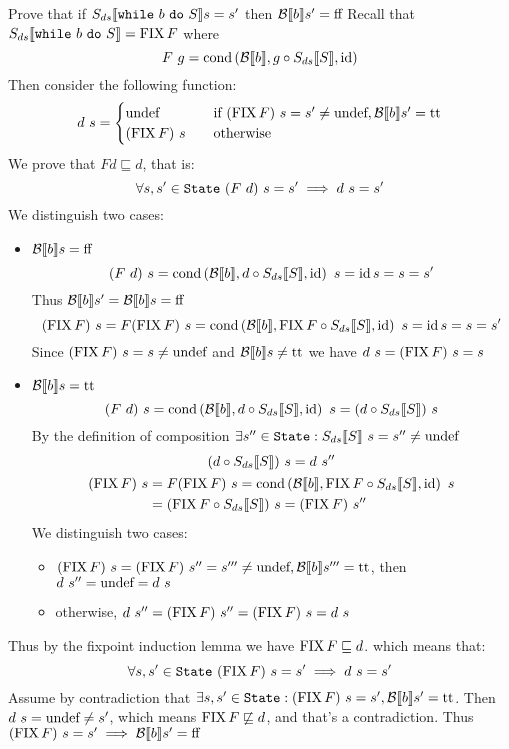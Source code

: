 \begin{exercise}{
    Prove that if $\Sds{\wwhile{b}{S}} s = s'$ then $\Bool{b} s' = \False$
}
    Recall that $\Sds{\wwhile{b}{S}} = \FIX F$ where
    \[ F\ g= \cond{\Bool{b}}{g \circ \Sds{S}}{\id} \]
    Then consider the following function:
    \[
        d\ s = \begin{cases}
            \undef &\quad \text{if } (\FIX F)\ s = s' \neq \undef, \Bool{b} s' = \True \\
            (\FIX F)\ s &\quad \text{otherwise}
        \end{cases}
    \]
    We prove that $F d \sqsubseteq d$, that is:
    \[ \forall s, s' \in \State\ (F\ d)\ s = s' \implies d\ s = s' \]
    We distinguish two cases:
    \begin{itemize}
        \item $\Bool{b} s = \False$
            \[ (F\ d)\ s = \cond{\Bool{b}}{d \circ \Sds{S}}{\id}\ s = \id s = s = s' \]
            Thus $\Bool{b} s' = \Bool{b} s = \False$
            \[ (\FIX F)\ s = F(\FIX F)\ s = \cond{\Bool{b}}{\FIX F \circ \Sds{S}}{\id}\ s = \id s = s = s' \]
            Since $(\FIX F)\ s = s \neq \undef$ and $\Bool{b} s \neq \True$ we have $d\ s = (\FIX F)\ s = s$
        \item $\Bool{b} s = \True$
            \[ (F\ d)\ s = \cond{\Bool{b}}{d \circ \Sds{S}}{\id}\ s = (d \circ \Sds{S})\ s \]
            By the definition of composition $\exists s'' \in \State : \Sds{S}\ s = s'' \neq \undef$
            \begin{gather*}
                (d \circ \Sds{S})\ s = d\ s'' \\
                \begin{aligned}
                    (\FIX F)\ s &= F(\FIX F)\ s = \cond{\Bool{b}}{\FIX F \circ \Sds{S}}{\id}\ s \\
                    &= (\FIX F \circ \Sds{S})\ s = (\FIX F)\ s''
                \end{aligned}
            \end{gather*}
            We distinguish two cases:
            \begin{itemize}
                \item $(\FIX F)\ s = (\FIX F)\ s'' = s''' \neq \undef, \Bool{b} s''' = \True$, then $d\ s'' = \undef = d\ s$
                \item otherwise, $d\ s'' = (\FIX F)\ s'' = (\FIX F)\ s = d\ s$
            \end{itemize}
    \end{itemize}
    Thus by the fixpoint induction lemma we have $\FIX F \sqsubseteq d$. which means that:
    \[ \forall s, s' \in \State\ (\FIX F)\ s = s' \implies d\ s = s' \]
    Assume by contradiction that $\exists s, s' \in \State : (\FIX F)\ s = s', \Bool{b} s' = \True $. Then $d\ s = \undef \neq s'$, which means $\FIX F \not\sqsubseteq d$, and that's a contradiction. Thus $(\FIX F)\ s = s' \implies \Bool{b} s' = \False$
\end{exercise}
